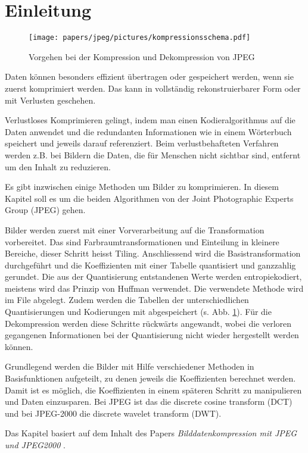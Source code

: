 %
%
%
%
\section{Einleitung\label{jpeg:section:einleitung}}
\begin{figure}
    \centering
    \texttt{[image: papers/jpeg/pictures/kompressionsschema.pdf]}
    \caption{Vorgehen bei der Kompression und Dekompression von JPEG
        \label{jpeg:fig:kompressionsschema}}
\end{figure}
Daten können besonders effizient übertragen oder gespeichert werden, wenn sie zuerst komprimiert werden.
Das kann in vollständig rekonstruierbarer Form oder mit Verlusten geschehen.

Verlustloses Komprimieren gelingt, indem man einen Kodieralgorithmus auf die Daten anwendet und die redundanten Informationen wie in einem Wörterbuch speichert und jeweils darauf referenziert. Beim verlustbehafteten Verfahren werden z.B. bei Bildern die Daten, die für Menschen nicht sichtbar sind, entfernt um den Inhalt zu reduzieren.

Es gibt inzwischen einige Methoden um Bilder zu komprimieren.
In diesem Kapitel soll es um die beiden Algorithmen von der Joint Photographic Experts Group (JPEG) gehen.
%
%


Bilder werden zuerst mit einer Vorverarbeitung auf die Transformation vorbereitet.
Das sind Farb\-raum\-trans\-formationen und Einteilung in kleinere Bereiche, dieser Schritt heisst Tiling.
An\-schlies\-send wird die Basistransformation durchgeführt und die Koeffizienten mit einer Tabelle quantisiert und ganzzahlig gerundet.
Die aus der Quantisierung entstandenen Werte werden entropiekodiert, meistens wird das Prinzip von Huffman verwendet.
Die verwendete Methode wird im File abgelegt.
Zudem werden die Tabellen der unterschiedlichen Quantisierungen und Kodierungen mit abgespeichert (s. Abb. \ref{jpeg:fig:kompressionsschema}).
Für die Dekompression werden diese Schritte rückwärts angewandt, wobei die verloren gegangenen Informationen bei der Quantisierung nicht wieder hergestellt werden können. 

Grundlegend werden die Bilder mit Hilfe verschiedener Methoden in Basisfunktionen aufgeteilt, zu denen jeweils die Koeffizienten berechnet werden.
Damit ist es möglich, die Koeffizienten in einem späteren Schritt zu manipulieren und Daten einzusparen. 
Bei JPEG ist das die discrete cosine transform (DCT) und bei JPEG-2000 die discrete wavelet transform (DWT).
%
%
%

Das Kapitel basiert auf dem Inhalt des Papers \textit{Bilddatenkompression mit JPEG und JPEG2000} \cite{jpeg:laurahochstrat}.
